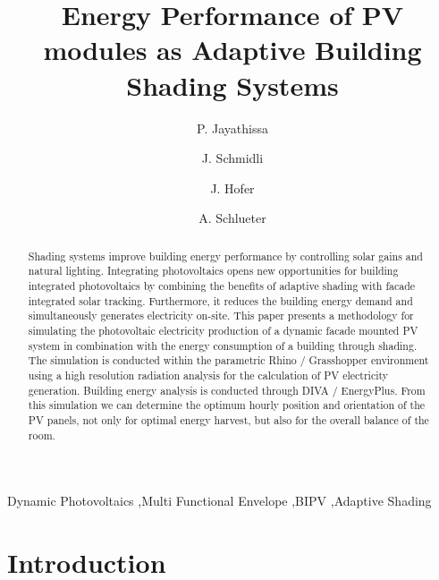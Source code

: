 \documentclass[preprint,11pt,5p]{elsarticle} %
\begin{document}
\begin{frontmatter}

\title{Energy Performance of PV modules as Adaptive Building Shading Systems} 

\author[ita]{P. Jayathissa}
\address[ita]{Architecture and Building Systems, Institute of Technology in Architecture, Department of Architecture, ETH Zurich, Switzerland} 

\author[ita]{J. Schmidli}

\author[ita]{J. Hofer}


\author[ita]{A. Schlueter  }




\begin{abstract}
Shading systems improve building energy performance by controlling solar gains and natural lighting. Integrating photovoltaics opens new opportunities for building integrated photovoltaics by combining the benefits of adaptive shading with facade integrated solar tracking. Furthermore, it reduces the building energy demand and simultaneously generates electricity on-site. This paper presents a methodology for simulating the photovoltaic electricity production of a dynamic facade mounted PV system in combination with the energy consumption of a building through shading.
The simulation is conducted within the parametric Rhino / Grasshopper environment using a high resolution radiation analysis for the calculation of PV electricity generation. Building energy analysis is conducted through DIVA / EnergyPlus. From this simulation we can determine the optimum hourly position and orientation of the PV panels, not only for optimal energy harvest, but also for the overall balance of the room.

\end{abstract}

\begin{keyword}
Dynamic Photovoltaics \sep Multi Functional Envelope \sep BIPV \sep Adaptive Shading
\end{keyword}

\end{frontmatter}

\section{Introduction}
\label{ch:introduction}

\end{document}
